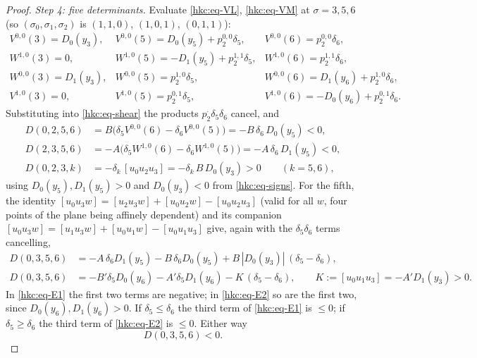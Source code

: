 \begin{proof}
\emph{Step 4: five determinants.} Evaluate \eqref{hkc:eq-VL},
\eqref{hkc:eq-VM} at $\sigma=3,5,6$ (so $(\sigma_0,\sigma_1,\sigma_2)$ is
$(1,1,0)$, $(1,0,1)$, $(0,1,1)$):
\[
\begin{array}{llll}
 V^{0,0}(3)=D_0(y_3), & V^{0,0}(5)=D_0(y_5)+p^{0,0}_2\delta_5, & V^{0,0}(6)=p^{0,0}_2\delta_6,\\
 W^{1,0}(3)=0,        & W^{1,0}(5)=-D_1(y_5)+p^{1,1}_2\delta_5,& W^{1,0}(6)=p^{1,1}_2\delta_6,\\
 W^{0,0}(3)=D_1(y_3), & W^{0,0}(5)=p^{1,0}_2\delta_5,          & W^{0,0}(6)=D_1(y_6)+p^{1,0}_2\delta_6,\\
 V^{1,0}(3)=0,        & V^{1,0}(5)=p^{0,1}_2\delta_5,          & V^{1,0}(6)=-D_0(y_6)+p^{0,1}_2\delta_6 .
\end{array}
\]
Substituting into \eqref{hkc:eq-shear} the products $p^{\cdot}_2\delta_5\delta_6$
cancel, and
\begin{align}
 D(0,2,5,6)&=B\bigl(\delta_5V^{0,0}(6)-\delta_6V^{0,0}(5)\bigr)=-B\,\delta_6\,D_0(y_5)<0,
   \label{hkc:eq-d1}\\
 D(2,3,5,6)&=-A\bigl(\delta_5W^{1,0}(6)-\delta_6W^{1,0}(5)\bigr)=-A\,\delta_6\,D_1(y_5)<0,
   \label{hkc:eq-d2}\\
 D(0,2,3,k)&=-\delta_k\,[u_0u_2u_3]=-\delta_k\,B\,D_0(y_3)>0\qquad(k=5,6),
   \label{hkc:eq-d3}
\end{align}
using $D_0(y_5),D_1(y_5)>0$ and $D_0(y_3)<0$ from \eqref{hkc:eq-signs}. For the
fifth, the identity $[u_0u_3w]=[u_2u_3w]+[u_0u_2w]-[u_0u_2u_3]$ (valid for all
$w$, four points of the plane being affinely dependent) and its companion
$[u_0u_3w]=[u_1u_3w]+[u_0u_1w]-[u_0u_1u_3]$ give, again with the
$\delta_5\delta_6$ terms cancelling,
\begin{align}
 D(0,3,5,6)&=-A\,\delta_6D_1(y_5)-B\,\delta_6D_0(y_5)+B\,|D_0(y_3)|\,(\delta_5-\delta_6),
   \label{hkc:eq-E1}\\
 D(0,3,5,6)&=-B'\delta_5D_0(y_6)-A'\delta_5D_1(y_6)-K\,(\delta_5-\delta_6),
   \qquad K:=[u_0u_1u_3]=-A'D_1(y_3)>0 .
   \label{hkc:eq-E2}
\end{align}
In \eqref{hkc:eq-E1} the first two terms are negative; in \eqref{hkc:eq-E2} so
are the first two, since $D_0(y_6),D_1(y_6)>0$. If $\delta_5\le\delta_6$ the
third term of \eqref{hkc:eq-E1} is $\le0$; if $\delta_5\ge\delta_6$ the third
term of \eqref{hkc:eq-E2} is $\le0$. Either way
\begin{equation}\label{hkc:eq-d4}
   D(0,3,5,6)<0 .
\end{equation}


\end{proof}
